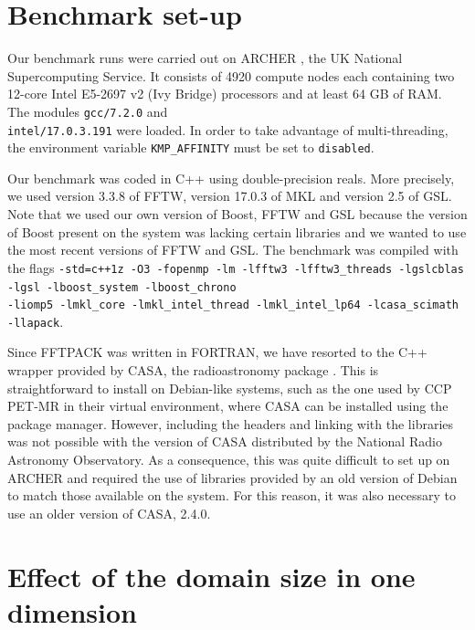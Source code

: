 \documentclass[12pt, a4paper]{article} \setlength{\textheight}{24cm}
\begin{document}
\section{Benchmark set-up}
Our benchmark runs were carried out on ARCHER \cite{archer}, the UK
National Supercomputing Service.  It consists of 4920 compute nodes
each containing two 12-core Intel E5-2697 v2 (Ivy Bridge) processors
and at least 64 GB of RAM. The modules \texttt{gcc/7.2.0} and \\
\texttt{intel/17.0.3.191} were loaded. In order to take advantage of
multi-threading, the environment variable \texttt{KMP\_AFFINITY} must
be set to \texttt{disabled}.

Our benchmark was coded in C++ using double-precision reals. More
precisely, we used version 3.3.8 of FFTW, version 17.0.3 of MKL and
version 2.5 of GSL. Note that we used our own version of Boost, FFTW
and GSL because the version of Boost present on the system was lacking
certain libraries and we wanted to use the most recent versions of
FFTW and GSL. The benchmark was compiled with the flags
\texttt{-std=c++1z -O3 -fopenmp -lm -lfftw3 -lfftw3\_threads
  -lgslcblas -lgsl -lboost\_system -lboost\_chrono\\-liomp5
  -lmkl\_core -lmkl\_intel\_thread -lmkl\_intel\_lp64 -lcasa\_scimath
  \\-llapack}.

Since FFTPACK was written in FORTRAN, we have resorted to the C++
wrapper provided by CASA, the radioastronomy package \cite{casa}. This
is straightforward to install on Debian-like systems, such as the one
used by CCP PET-MR in their virtual environment, where CASA can be
installed using the package manager. However, including the headers
and linking with the libraries was not possible with the version of
CASA distributed by the National Radio Astronomy Observatory.  As a
consequence, this was quite difficult to set up on ARCHER and required
the use of libraries provided by an old version of Debian to match
those available on the system. For this reason, it was also necessary
to use an older version of CASA, 2.4.0.


\section{Effect of the domain size in one
  dimension}\label{PERFORMANCE1D}
\end{document}
